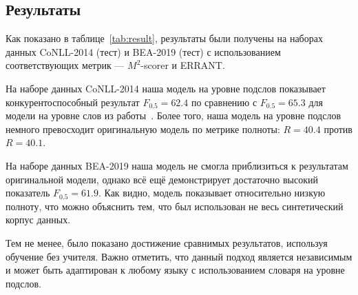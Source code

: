 \subsection{Результаты}


Как показано в таблице~\ref{tab:result}, результаты были получены на наборах данных CoNLL-2014 (тест) и BEA-2019 (тест) с использованием соответствующих метрик --- $M^{2}$-scorer и ERRANT. 

На наборе данных CoNLL-2014 наша модель на уровне подслов показывает конкурентоспособный результат $F_{0.5} = 62.4$ по сравнению с $F_{0.5} = 65.3$ для модели на уровне слов из работы~\cite{b15}. Более того, наша модель на уровне подслов немного превосходит оригинальную модель по метрике полноты: $R = 40.4$ против $R = 40.1$.

На наборе данных BEA-2019 наша модель не смогла приблизиться к результатам оригинальной модели, однако всё ещё демонстрирует достаточно высокий показатель $F_{0.5} = 61.9$. Как видно, модель показывает относительно низкую полноту, что можно объяснить тем, что был использован не весь синтетический корпус данных. 

Тем не менее, было показано достижение сравнимых результатов, используя обучение без учителя. Важно отметить, что данный подход является независимым и может быть адаптирован к любому языку с использованием словаря на уровне подслов.

